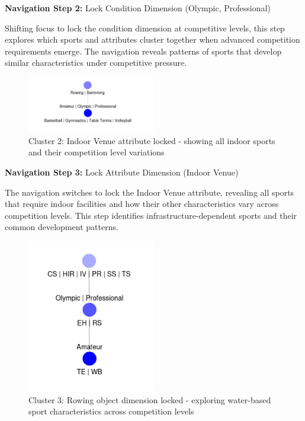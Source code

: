 \documentclass{article}
\begin{document}
\textbf{Navigation Step 2:} Lock Condition Dimension (Olympic, Professional)

Shifting focus to lock the condition dimension at competitive levels, this step explores which sports and attributes cluster together when advanced competition requirements emerge. The navigation reveals patterns of sports that develop similar characteristics under competitive pressure.

\begin{figure}[htbp]
  \centering
  \includegraphics[width=0.5\textwidth]{cluster_2.png}
  \caption{Cluster 2: Indoor Venue attribute locked - showing all indoor sports and their competition level variations}
  \label{fig:cluster_2}
\end{figure}

\textbf{Navigation Step 3:} Lock Attribute Dimension (Indoor Venue)

The navigation switches to lock the Indoor Venue attribute, revealing all sports that require indoor facilities and how their other characteristics vary across competition levels. This step identifies infrastructure-dependent sports and their common development patterns.

\newpage
\begin{figure}[htbp]
  \centering
  \includegraphics[width=0.5\textwidth]{cluster_3.png}
  \caption{Cluster 3: Rowing object dimension locked - exploring water-based sport characteristics across competition levels}
  \label{fig:cluster_3}
\end{figure}
\end{document}
